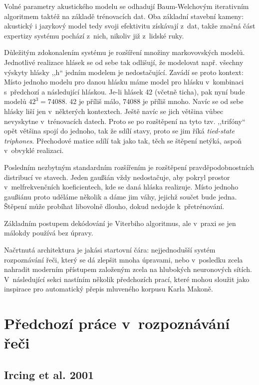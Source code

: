 Volné parametry akustického modelu se odhadují Baum-Welchovým iterativním
algoritmem taktéž na základě trénovacích dat. Oba základní stavební kameny:
akustický i jazykový model tedy svoji efektivitu získávají z~dat, takže značná
část expertizy systému pochází z~nich, nikoliv již z~lidské ruky.

Důležitým zdokonalením systému je rozšíření množiny markovovských modelů.
Jednotlivé realizace hlásek se od sebe tak odlišují, že modelovat např. všechny
výskyty hlásky ,,h`` jedním modelem je nedostačující. Zavádí se proto kontext:
Místo jednoho modelu pro danou hlásku máme model pro hlásku v~kombinaci
s~předchozí a následující hláskou. Je-li hlásek 42 (včetně ticha), pak nyní
bude modelů $42^3 = 74088$. 42 je příliš málo, 74088 je příliš mnoho. Navíc se
od sebe hlásky liší jen v~některých kontextech. Ještě navíc se jich většina
vůbec nevyskytne v~trénovacích datech. Proto se po rozštěpení na tyto tzv.
,,trifóny`` opět většina spojí do jednoho, tak že sdílí stavy, proto se jim říká
\textit{tied-state triphones}. Přechodové matice sdílí tak jako tak, těch se
štěpení netýká, aspoň v~obvyklé realizaci.

Posledním nezbytným standardním rozšířením je rozštěpení pravděpodobnostních
distribucí ve stavech. Jeden gaußián vždy nedostačuje, aby pokryl prostor
v~melfrekvenčních koeficientech, kde se daná hláska realizuje. Místo jednoho
gaußiánu proto uděláme několik a dáme jim váhy, jejichž součet bude jedna.
Štěpení může probíhat libovolně dlouho, dokud nedojde k~přetrénování.

Základním postupem dekódování je Viterbiho algoritmus, ale v~praxi se jen
málokdy používá bez úpravy.

Načrtnutá architektura je jakási startovní čára: nejjednodušší systém
rozpoznávání řeči, který se dá zlepšit mnoha úpravami, nebo v~posledku zcela
nahradit moderním přístupem založeným zcela na hlubokých neuronových sítích.
V~následující sekci nastíním několik předchozích prací, které mohou sloužit jako
inspirace pro automatický přepis mluveného korpusu Karla Makoně.

\section{Předchozí práce v~rozpoznávání řeči}

\subsection{Ircing et al. 2001}

